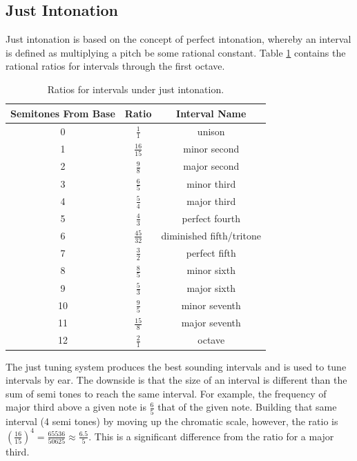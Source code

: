 \subsection{Just Intonation} \label{mathinmusic:intervals:just}

Just intonation is based on the concept of perfect intonation, whereby an interval is defined as multiplying a pitch be some rational constant.
Table \ref{table:justintervals} contains the rational ratios for intervals through the first octave.

\begin{table}
	\centering
	\begin{tabular}{c c c}
		Semitones From Base & Ratio & Interval Name\\
		\hline
		0 & $\frac{1}{1}$ & unison\\[4pt]
		1 & $\frac{16}{15}$ & minor second\\[4pt]
		2 & $\frac{9}{8}$ & major second\\[4pt]
		3 & $\frac{6}{5}$ & minor third\\[4pt]
		4 & $\frac{5}{4}$ & major third\\[4pt]
		5 & $\frac{4}{3}$ & perfect fourth\\[4pt]
		6 & $\frac{45}{32}$ & diminished fifth/tritone\\[4pt]
		7 & $\frac{3}{2}$ & perfect fifth\\[4pt]
		8 & $\frac{8}{5}$ & minor sixth\\[4pt]
		9 & $\frac{5}{3}$ & major sixth\\[4pt]
		10 & $\frac{9}{5}$ & minor seventh\\[4pt]
		11 & $\frac{15}{8}$ & major seventh\\[4pt]
		12 & $\frac{2}{1}$ & octave
	\end{tabular}
	\caption{Ratios for intervals under just intonation.}
	\label{table:justintervals}
\end{table}

The just tuning system produces the best sounding intervals and is used to tune intervals by ear.
The downside is that the size of an interval is different than the sum of semi tones to reach the same interval.
For example, the frequency of major third above a given note is $\frac{6}{5}$ that of the given note.
Building that same interval (4 semi tones) by moving up the chromatic scale, however, the ratio is $(\frac{16}{15})^{4} = \frac{65536}{50625} \approx \frac{6.5}{5}$.
This is a significant difference from the ratio for a major third.

